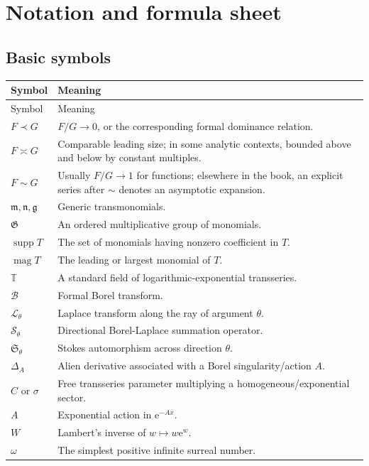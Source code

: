\documentclass[11pt,openany]{book}
\theoremstyle{plain}
\theoremstyle{definition}
\theoremstyle{remark}
\newcommand{\Tfield}{\mathbb{T}}
\newcommand{\G}{\mathfrak{G}}
\newcommand{\m}{\mathfrak{m}}
\newcommand{\n}{\mathfrak{n}}
\newcommand{\g}{\mathfrak{g}}
\newcommand{\supp}{\operatorname{supp}}
\newcommand{\magop}{\operatorname{mag}}
\newcommand{\Borel}{\mathcal{B}}
\newcommand{\Laplace}{\mathcal{L}}
\newcommand{\Stokes}{\mathfrak{S}}
\newcommand{\e}{\mathrm{e}}
\begin{document}
\chapter{Notation and formula sheet}
\label{app:formulas}

\section{Basic symbols}

\renewcommand{\arraystretch}{1.25}
\begin{longtable}{>{\raggedright\arraybackslash}p{}p{}}
\toprule
Symbol & Meaning \\
\midrule
\endfirsthead
\toprule
Symbol & Meaning \\
\midrule
\endhead
$F\prec G$ & $F/G\to0$, or the corresponding formal dominance relation.\\
$F\asymp G$ & Comparable leading size; in some analytic contexts, bounded above and below by constant multiples.\\
$F\sim G$ & Usually $F/G\to1$ for functions; elsewhere in the book, an explicit series after $\sim$ denotes an asymptotic expansion.\\
$\m,\n,\g$ & Generic transmonomials.\\
$\G$ & An ordered multiplicative group of monomials.\\
$\supp T$ & The set of monomials having nonzero coefficient in $T$.\\
$\magop T$ & The leading or largest monomial of $T$.\\
$\Tfield$ & A standard field of logarithmic-exponential transseries.\\
$\Borel$ & Formal Borel transform.\\
$\Laplace_\theta$ & Laplace transform along the ray of argument $\theta$.\\
$\mathscr S_\theta$ & Directional Borel-Laplace summation operator.\\
$\Stokes_\theta$ & Stokes automorphism across direction $\theta$.\\
$\Delta_A$ & Alien derivative associated with a Borel singularity/action $A$.\\
$C$ or $\sigma$ & Free transseries parameter multiplying a homogeneous/exponential sector.\\
$A$ & Exponential action in $\e^{-Ax}$.\\
$W$ & Lambert's inverse of $w\mapsto w\e^w$.\\
$\omega$ & The simplest positive infinite surreal number.\\
\bottomrule
\end{longtable}
\renewcommand{\arraystretch}{1}
\end{document}
